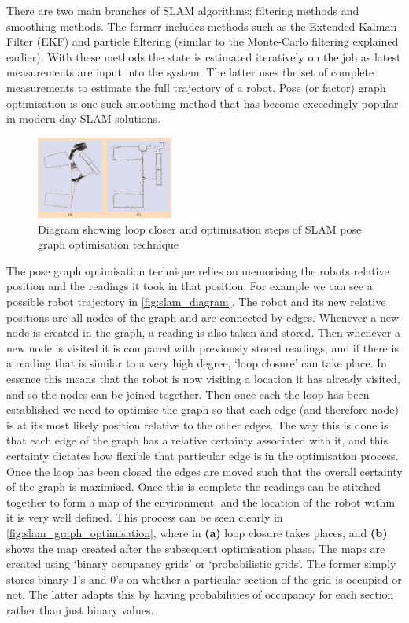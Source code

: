 There are two main branches of SLAM algorithms; filtering methods and smoothing methods. The former includes methods such as the Extended Kalman Filter (EKF) and particle filtering (similar to the Monte-Carlo filtering explained earlier). With these methods the state is estimated iteratively on the job as latest measurements are input into the system. The latter uses the set of complete measurements to estimate the full trajectory of a robot. Pose (or factor) graph optimisation is one such smoothing method that has become exceedingly popular in modern-day SLAM solutions.

\begin{figure}[htb]
      \centering
      \includegraphics[width=0.4\textwidth]{background/images/slam_graph_optimisation.png}
      \caption{Diagram showing loop closer and optimisation steps of SLAM pose graph optimisation technique\cite{PoseGraphOptimisation}}
      \label{fig:slam_graph_optimisation}
\end{figure}

The pose graph optimisation technique relies on memorising the robots relative position and the readings it took in that position. For example we can see a possible robot trajectory in \ref{fig:slam_diagram}. The robot and its new relative positions are all nodes of the graph and are connected by edges. Whenever a new node is created in the graph, a reading is also taken and stored. Then whenever a new node is visited it is compared with previously stored readings, and if there is a reading that is similar to a very high degree, `loop closure' can take place. In essence this means that the robot is now visiting a location it has already visited, and so the nodes can be joined together. Then once each the loop has been established we need to optimise the graph so that each edge (and therefore node) is at its most likely position relative to the other edges. The way this is done is that each edge of the graph has a relative certainty associated with it, and this certainty dictates how flexible that particular edge is in the optimisation process. Once the loop has been closed the edges are moved such that the overall certainty of the graph is maximised. Once this is complete the readings can be stitched together to form a map of the environment, and the location of the robot within it is very well defined. This process can be seen clearly in \autoref{fig:slam_graph_optimisation}, where in \textbf{(a)} loop closure takes places, and \textbf{(b)} shows the map created after the subsequent optimisation phase. The maps are created using `binary occupancy grids' or `probabilistic grids'. The former simply stores binary 1's and 0's on whether a particular section of the grid is occupied or not. The latter adapts this by having probabilities of occupancy for each section rather than just binary values.

